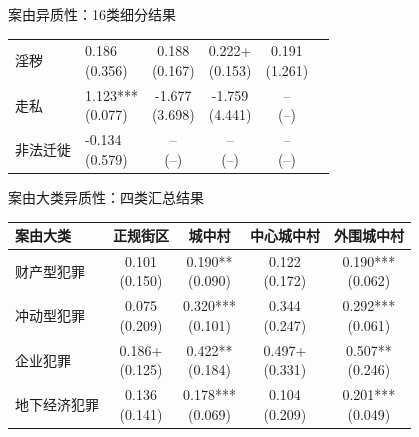 \documentclass[aspectratio=169,10pt]{ctexbeamer}
\begin{document}
\begin{frame}[plain]{案由异质性：16类细分结果}
\begin{minipage}[t]{0.48\textwidth}
\begin{tabular}{llcccc}
      淫秽 & \makecell{0.186\\(0.356)} & \makecell{0.188\\(0.167)} & \makecell{0.222+\\(0.153)} & \makecell{0.191\\(1.261)} \\
      走私 & \makecell{1.123***\\(0.077)} & \makecell{-1.677\\(3.698)} & \makecell{-1.759\\(4.441)} & \makecell{--\\(--)} \\
      非法迁徙 & \makecell{-0.134\\(0.579)} & \makecell{--\\(--)} & \makecell{--\\(--)} & \makecell{--\\(--)} \\
      \bottomrule
    \end{tabular}
  \end{minipage}

  \vspace{0.35em}
\end{frame}

\begin{frame}[plain]{案由大类异质性：四类汇总结果}
  \centering
  \scriptsize
  \begin{tabular}{lcccc}
    \toprule
    案由大类 & 正规街区 & 城中村 & 中心城中村 & 外围城中村 \\
    \midrule
    财产型犯罪 & \makecell{0.101\\(0.150)} & \makecell{0.190**\\(0.090)} & \makecell{0.122\\(0.172)} & \makecell{0.190***\\(0.062)} \\
    冲动型犯罪 & \makecell{0.075\\(0.209)} & \makecell{0.320***\\(0.101)} & \makecell{0.344\\(0.247)} & \makecell{0.292***\\(0.061)} \\
    企业犯罪 & \makecell{0.186+\\(0.125)} & \makecell{0.422**\\(0.184)} & \makecell{0.497+\\(0.331)} & \makecell{0.507**\\(0.246)} \\
    地下经济犯罪 & \makecell{0.136\\(0.141)} & \makecell{0.178***\\(0.069)} & \makecell{0.104\\(0.209)} & \makecell{0.201***\\(0.049)} \\
    \bottomrule
  \end{tabular}

  \vspace{0.4em}
\end{frame}
\end{document}
